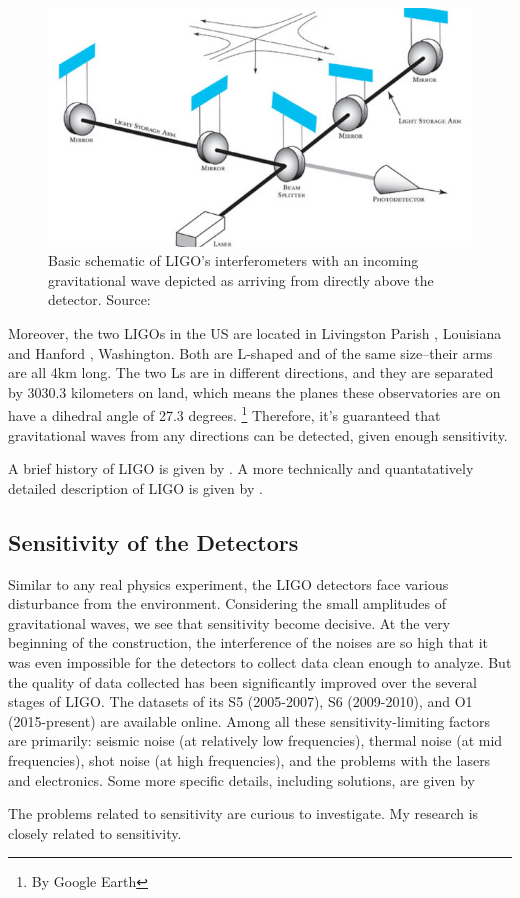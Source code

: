 \documentclass[aps,prd,preprint]{revtex4}
\begin{document}
\begin{figure}
	\includegraphics{basic_ifo_diagram}
	\caption{Basic schematic of LIGO's interferometers with an incoming gravitational wave depicted as arriving from directly above the detector. Source: \cite{CaltechLIGO}}
\end{figure}
\par Moreover, the two LIGOs in the US are located in Livingston Parish , Louisiana and Hanford , Washington. Both are L-shaped and of the same size--their arms are all 4km long. The two Ls are in different directions, and they are separated by 3030.3 kilometers  on land, which means the planes these observatories are on have a dihedral angle of 27.3 degrees. \footnote{By Google Earth} Therefore, it's guaranteed that gravitational waves from any directions can be detected, given enough sensitivity.
\par A brief history of LIGO is given by \cite{BHLIGO}. A more technically and quantatatively detailed description of LIGO is given by \cite{S6Run}.

\subsection{Sensitivity of the Detectors}
Similar to any real physics experiment, the LIGO detectors face various disturbance from the environment. Considering the small amplitudes of gravitational waves, we see that sensitivity become decisive. At the very beginning of the construction, the interference of the noises are so high that it was even impossible for the detectors to collect data clean enough to analyze. But the quality of data collected has been significantly improved over the several stages of LIGO. The datasets of its S5 (2005-2007), S6 (2009-2010), and O1 (2015-present) are available online. \cite{TLdata} Among all these sensitivity-limiting factors are primarily: seismic noise (at relatively low frequencies), thermal noise (at mid frequencies), shot noise (at high frequencies), and the problems with the lasers and electronics. Some more specific details, including solutions, are given by \cite{Noise, thermal, seismic}
\par The problems related to sensitivity are curious to investigate. My research is closely related to sensitivity.
\end{document}
